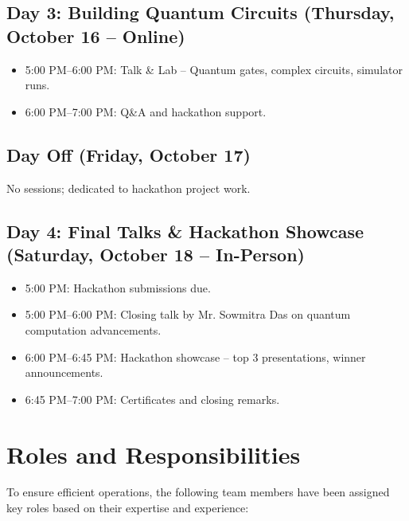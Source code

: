 \documentclass[11pt,a4paper]{article}
\begin{document}
\subsection{Day 3: Building Quantum Circuits (Thursday, October 16 -- Online)}
\begin{itemize}
    \item 5:00 PM--6:00 PM: Talk \& Lab -- Quantum gates, complex circuits, simulator runs.
    \item 6:00 PM--7:00 PM: Q\&A and hackathon support.
\end{itemize}

\subsection{Day Off (Friday, October 17)}
No sessions; dedicated to hackathon project work.

\subsection{Day 4: Final Talks \& Hackathon Showcase (Saturday, October 18 -- In-Person)}
\begin{itemize}
    \item 5:00 PM: Hackathon submissions due.
    \item 5:00 PM--6:00 PM: Closing talk by Mr. Sowmitra Das on quantum computation advancements.
    \item 6:00 PM--6:45 PM: Hackathon showcase -- top 3 presentations, winner announcements.
    \item 6:45 PM--7:00 PM: Certificates and closing remarks.
\end{itemize}

\section{Roles and Responsibilities}

To ensure efficient operations, the following team members have been assigned key roles based on their expertise and experience:
\end{document}
